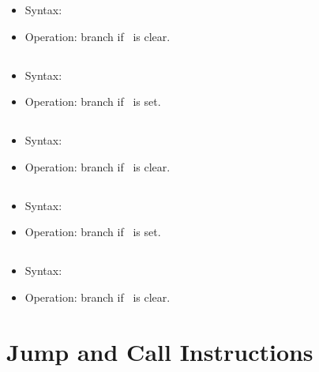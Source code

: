 \begin{itemize}
\item Syntax: 
\item Operation: branch if \flagI\ is clear.
\end{itemize}

\subsection{}

\begin{itemize}
\item Syntax: 
\item Operation: branch if \flagU\ is set.
\end{itemize}

\subsection{}

\begin{itemize}
\item Syntax: 
\item Operation: branch if \flagU\ is clear.
\end{itemize}

\subsection{}

\begin{itemize}
\item Syntax: 
\item Operation: branch if \flagX\ is set.
\end{itemize}

\subsection{}

\begin{itemize}
\item Syntax: 
\item Operation: branch if \flagX\ is clear.
\end{itemize}

\section{Jump and Call Instructions}

